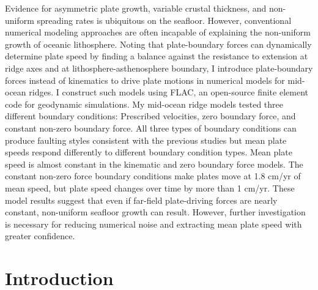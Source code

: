 \documentclass[letterpaper,12pt,notitle]{memphisthesis}                     %
\begin{document}
Evidence for asymmetric plate growth, variable crustal thickness, and non-uniform spreading rates is ubiquitous on the seafloor. However, conventional numerical modeling approaches are often incapable of explaining the non-uniform growth of oceanic lithosphere. Noting that plate-boundary forces can dynamically determine plate speed by finding a balance against the resistance to extension at ridge axes and at lithosphere-asthenosphere boundary, I introduce plate-boundary forces instead of kinematics to drive plate motions in numerical models for mid-ocean ridges. I construct such models using FLAC, an open-source finite element code for geodynamic simulations. My mid-ocean ridge models tested three different boundary conditions: Prescribed velocities, zero boundary force, %
and constant non-zero boundary force. All three types of boundary conditions can produce faulting styles consistent with the previous studies but mean plate speeds respond differently to different boundary condition types. Mean plate speed is almost constant in the kinematic and zero boundary force models. The constant non-zero force boundary conditions make plates move at 1.8 cm/yr of mean speed, but plate speed changes over time by more than 1 cm/yr. These model results suggest that even if far-field plate-driving forces are nearly constant, non-uniform seafloor growth can result. However, further investigation is necessary for reducing numerical noise and extracting mean plate speed with greater confidence.

\newpage

\begin{singlespace}
	\tableofcontents
\end{singlespace}

\newpage



\begin{singlespace}
	\listoffigures
\end{singlespace}

\newpage


\chapter{Introduction}
\setcounter{section}{0}
\setcounter{subsection}{0}
\end{document}

